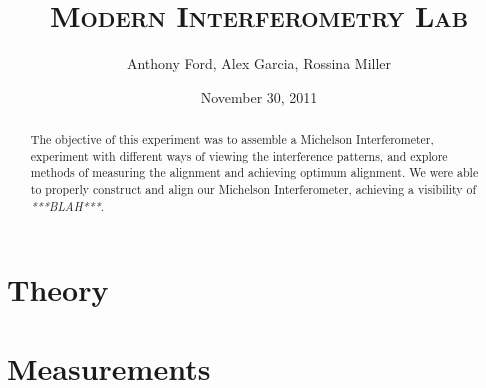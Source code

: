 \documentclass[12pt,titlepage,final]{article}
\begin{document}
\title{\textsc{Modern Interferometry Lab}}
\author{Anthony Ford, Alex Garcia, Rossina Miller}
\date{November 30, 2011}
\maketitle

\clearpage

\begin{abstract}
The objective of this experiment was to assemble a Michelson Interferometer,
experiment with different ways of viewing the interference patterns, and explore
methods of measuring the alignment and achieving optimum alignment. We were able
to properly construct and align our Michelson Interferometer, achieving a
visibility of \emph{***BLAH***}.
\end{abstract}



\section{Theory}






\section{Measurements}
\end{document}

